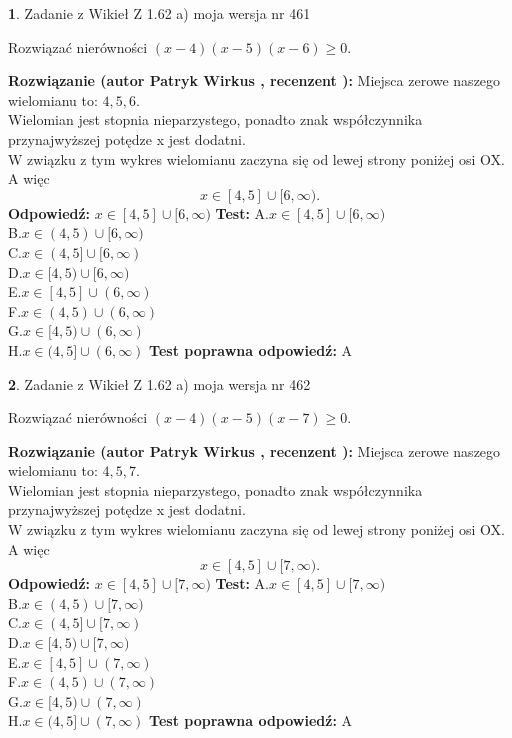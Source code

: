 \documentclass[12pt, a4paper]{article}
\theoremstyle{definition} %
\newtheorem{zad}{}
\newcommand{\zadStart}[1]{\begin{zad}#1\newline}
\newcommand{\zadStop}{\end{zad}}
\newcommand{\rozwStart}[2]{\noindent \textbf{Rozwiązanie (autor #1 , recenzent #2): }\newline}
\newcommand{\rozwStop}{\newline}
\newcommand{\odpStart}{\noindent \textbf{Odpowiedź:}\newline}
\newcommand{\odpStop}{\newline}
\newcommand{\testStart}{\noindent \textbf{Test:}\newline}
\newcommand{\testStop}{\newline}
\newcommand{\kluczStart}{\noindent \textbf{Test poprawna odpowiedź:}\newline}
\newcommand{\kluczStop}{\newline}
\begin{document}
\zadStart{Zadanie z Wikieł Z 1.62 a) moja wersja nr 461}

Rozwiązać nierówności $(x-4)(x-5)(x-6)\ge0$.
\zadStop
\rozwStart{Patryk Wirkus}{}
Miejsca zerowe naszego wielomianu to: $4, 5, 6$.\\
Wielomian jest stopnia nieparzystego, ponadto znak współczynnika przy\linebreak najwyższej potędze x jest dodatni.\\ W związku z tym wykres wielomianu zaczyna się od lewej strony poniżej osi OX. A więc $$x \in [4,5] \cup [6,\infty).$$
\rozwStop
\odpStart
$x \in [4,5] \cup [6,\infty)$
\odpStop
\testStart
A.$x \in [4,5] \cup [6,\infty)$\\
B.$x \in (4,5) \cup [6,\infty)$\\
C.$x \in (4,5] \cup [6,\infty)$\\
D.$x \in [4,5) \cup [6,\infty)$\\
E.$x \in [4,5] \cup (6,\infty)$\\
F.$x \in (4,5) \cup (6,\infty)$\\
G.$x \in [4,5) \cup (6,\infty)$\\
H.$x \in (4,5] \cup (6,\infty)$
\testStop
\kluczStart
A
\kluczStop



\zadStart{Zadanie z Wikieł Z 1.62 a) moja wersja nr 462}

Rozwiązać nierówności $(x-4)(x-5)(x-7)\ge0$.
\zadStop
\rozwStart{Patryk Wirkus}{}
Miejsca zerowe naszego wielomianu to: $4, 5, 7$.\\
Wielomian jest stopnia nieparzystego, ponadto znak współczynnika przy\linebreak najwyższej potędze x jest dodatni.\\ W związku z tym wykres wielomianu zaczyna się od lewej strony poniżej osi OX. A więc $$x \in [4,5] \cup [7,\infty).$$
\rozwStop
\odpStart
$x \in [4,5] \cup [7,\infty)$
\odpStop
\testStart
A.$x \in [4,5] \cup [7,\infty)$\\
B.$x \in (4,5) \cup [7,\infty)$\\
C.$x \in (4,5] \cup [7,\infty)$\\
D.$x \in [4,5) \cup [7,\infty)$\\
E.$x \in [4,5] \cup (7,\infty)$\\
F.$x \in (4,5) \cup (7,\infty)$\\
G.$x \in [4,5) \cup (7,\infty)$\\
H.$x \in (4,5] \cup (7,\infty)$
\testStop
\kluczStart
A
\kluczStop
\end{document}
